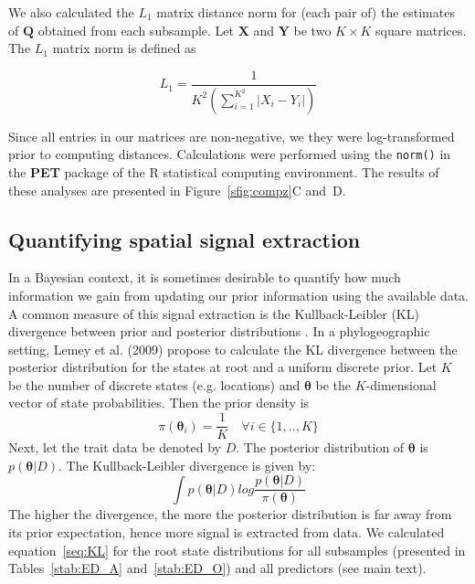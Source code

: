 \documentclass[a4paper,10pt]{article}
\begin{document}
We also calculated the $L_1$ matrix distance norm for (each pair of) the estimates of $\mathbf{Q}$ obtained from each subsample.
Let $\mathbf{X}$ and $\mathbf{Y}$ be two $K \times K$ square matrices.
The $L_1$ matrix norm is defined as

\begin{equation}
\label{seq:L1}
 L_1 = \frac{1}{K^{2} (\sum_{i=1}^{K^2} |X_i-Y_i| ) }
\end{equation}

Since all entries in our matrices are non-negative, we they were log-transformed prior to computing distances.
Calculations were performed using the \verb|norm()| in the \textbf{PET} package of the R statistical computing environment.
The results of these analyses are presented in Figure~\ref{sfig:compz}C and~D.

\subsection{Quantifying spatial signal extraction}
 In a Bayesian context, it is sometimes desirable to quantify how much information we gain from updating our prior information using the available data.
 A common measure of this signal extraction is the Kullback-Leibler (KL) divergence between prior and posterior distributions \cite{M-KL}.
 In a phylogeographic setting, Lemey et al. (2009) \cite{M-roots} propose to calculate the KL divergence between the posterior distribution for the states at root and a uniform discrete prior.
 Let $K$ be the number of discrete states (e.g. locations) and $\boldsymbol\theta$ be the $K$-dimensional vector of state probabilities.
 Then the prior density is
 \begin{equation}
 \label{seq:prior}
  \pi(\boldsymbol\theta_i) = \frac{1}{K} \quad \forall i \in \{1,..,K\} 
 \end{equation}
Next, let the trait data be denoted by $D$.
The posterior distribution of $\boldsymbol\theta$ is $p(\boldsymbol\theta|D)$.
The Kullback-Leibler divergence is given by:
\begin{equation}
 \label{seq:KL}
 \int p(\boldsymbol\theta|D)log\frac{p(\boldsymbol\theta|D)}{\pi(\boldsymbol\theta)}
\end{equation}
The higher the divergence, the more the posterior distribution is far away from its prior expectation, hence more signal is extracted from data.
We calculated equation~\ref{seq:KL} for the root state distributions for all subsamples (presented in Tables~\ref{stab:ED_A} and~\ref{stab:ED_O}) and all predictors (see main text).
\end{document}
